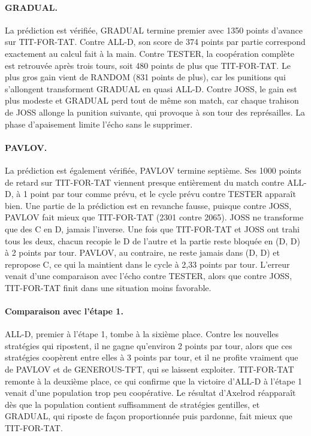 \documentclass[11pt,a4paper]{article}
\begin{document}
\paragraph{GRADUAL.} La prédiction est vérifiée, GRADUAL termine premier avec 1350 points d'avance sur TIT-FOR-TAT. Contre
ALL-D, son score de 374 points par partie correspond exactement au calcul fait à la main. Contre TESTER, la coopération
complète est retrouvée après trois tours, soit 480 points de plus que TIT-FOR-TAT. Le plus gros gain vient de RANDOM (831
points de plus), car les punitions qui s'allongent transforment GRADUAL en quasi ALL-D. Contre JOSS, le gain est plus modeste
et GRADUAL perd tout de même son match, car chaque trahison de JOSS allonge la punition suivante, qui provoque à son tour des
représailles. La phase d'apaisement limite l'écho sans le supprimer.

\paragraph{PAVLOV.} La prédiction est également vérifiée, PAVLOV termine septième. Ses 1000 points de retard sur TIT-FOR-TAT
viennent presque entièrement du match contre ALL-D, à 1 point par tour comme prévu, et le cycle prévu contre TESTER apparaît
bien. Une partie de la prédiction est en revanche fausse, puisque contre JOSS, PAVLOV fait mieux que TIT-FOR-TAT (2301 contre
2065). JOSS ne transforme que des C en D, jamais l'inverse. Une fois que TIT-FOR-TAT et JOSS ont trahi tous les deux, chacun
recopie le D de l'autre et la partie reste bloquée en (D, D) à 2 points par tour. PAVLOV, au contraire, ne reste jamais dans
(D, D) et repropose C, ce qui la maintient dans le cycle à 2,33 points par tour. L'erreur venait d'une comparaison avec l'écho
contre TESTER, alors que contre JOSS, TIT-FOR-TAT finit dans une situation moins favorable.

\paragraph{Comparaison avec l'étape 1.} ALL-D, premier à l'étape 1, tombe à la sixième place. Contre les nouvelles stratégies
qui ripostent, il ne gagne qu'environ 2 points par tour, alors que ces stratégies coopèrent entre elles à 3 points par tour, et
il ne profite vraiment que de PAVLOV et de GENEROUS-TFT, qui se laissent exploiter. TIT-FOR-TAT remonte à la deuxième place, ce
qui confirme que la victoire d'ALL-D à l'étape 1 venait d'une population trop peu coopérative. Le résultat d'Axelrod réapparaît
dès que la population contient suffisamment de stratégies gentilles, et GRADUAL, qui riposte de façon proportionnée puis
pardonne, fait mieux que TIT-FOR-TAT.
\end{document}
